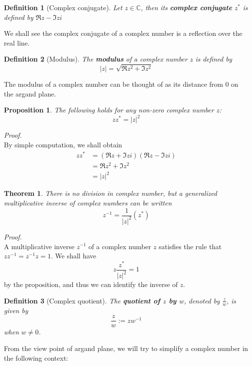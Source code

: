 \documentclass[12pt]{article}
\newtheorem{definition}{Definition}[section]
\newtheorem*{theorem}{Theorem}
\newtheorem*{proposition}{Proposition}
\renewenvironment{proof}[1][Proof]{\begin{snugshade*} \textit{{#1}.}\\}{\hfill \qedsymbol \end{snugshade*}}
\begin{document}
    \begin{definition}[Complex conjugate]
        Let $z\in\mathbb{C}$, then its \textbf{complex conjugate} $z^*$ is defined by $\Re{z}-\Im{z}i$
    \end{definition}

    We shall see the complex conjugate of a complex number is a reflection over the real line.
    
    \begin{definition}[Modulus]
        The \textbf{modulus} of a complex number $z$ is defined by \[|z|=\sqrt{\Re{z}^2+\Im{z}^2}\]
    \end{definition}

    The modulus of a complex number can be thought of as its distance from 0 on the argand plane.

    \begin{proposition}
        The following holds for any non-zero complex number $z$:\[z z^* = |z|^2\]
    \end{proposition}

    \begin{proof}
        By simple computation, we shall obtain \begin{align*}
            z z^* &= (\Re{z}+\Im{z}i)(\Re{z}-\Im{z}i)\\
            &=\Re{z}^2+\Im{z}^2\\
            &=|z|^2
        \end{align*}
    \end{proof}

    \begin{theorem}
        There is no division in complex number, but a generalized multiplicative inverse of complex numbers can be written \[z^{-1}=\frac{1}{|z|^2}(z^*)\]
    \end{theorem}

    \begin{proof}
        A multiplicative inverse $z^{-1}$ of a complex number $z$ satisfies the rule that $z z^{-1}=z^{-1}z=1$. We shall have \[z\frac{z^*}{|z|^2}=1\] by the proposition, and thus we can identify the inverse of $z$.
    \end{proof}

    \begin{definition}[Complex quotient]
        The \textbf{quotient of $z$ by $w$}, denoted by $\frac{z}{w}$, is given by \[\frac{z}{w}:=zw^{-1}\] when $w\neq 0$.
    \end{definition}

    From the view point of argand plane, we will try to simplify a complex number in the following context:
\end{document}
